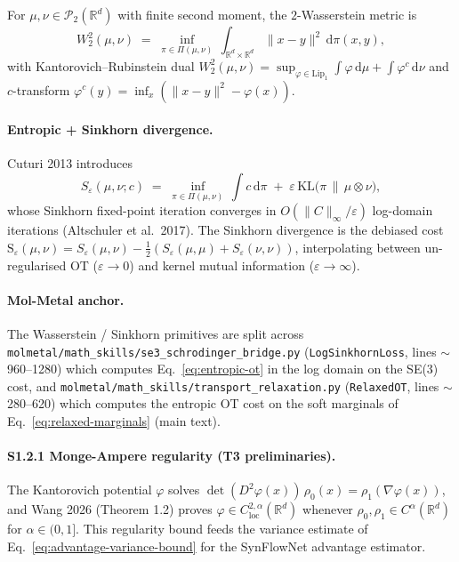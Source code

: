 For $\mu, \nu \in \mathcal{P}_{2}(\mathbb{R}^{d})$ with finite
second moment, the $2$-Wasserstein metric is
\begin{equation}
  \label{eq:w2-def}
  W_{2}^{2}(\mu, \nu) \;=\; \inf_{\pi \in \Pi(\mu, \nu)} \,
        \int_{\mathbb{R}^{d} \times \mathbb{R}^{d}} \| x - y \|^{2} \,
        \mathrm{d}\pi(x, y),
\end{equation}
with Kantorovich--Rubinstein dual
$W_{2}^{2}(\mu, \nu) = \sup_{\varphi \in \mathrm{Lip}_{1}}
\int \varphi \,\mathrm{d}\mu + \int \varphi^{c} \,\mathrm{d}\nu$
and $c$-transform
$\varphi^{c}(y) = \inf_{x} (\|x - y\|^{2} - \varphi(x))$.

\paragraph{Entropic + Sinkhorn divergence.}
Cuturi 2013 \cite{cuturi2013sinkhorn} introduces
\begin{equation}
  \label{eq:entropic-ot}
  S_{\varepsilon}(\mu, \nu; c) \;=\; \inf_{\pi \in \Pi(\mu, \nu)} \,
        \int c \,\mathrm{d}\pi \;+\; \varepsilon \,
        \mathrm{KL}\!\bigl(\pi \,\|\, \mu \otimes \nu \bigr),
\end{equation}
whose Sinkhorn fixed-point iteration converges in $O(\|C\|_{\infty}
/ \varepsilon)$ log-domain iterations (Altschuler et al.\ 2017).
The Sinkhorn divergence is the debiased cost
$\mathrm{S}_{\varepsilon}(\mu, \nu) = S_{\varepsilon}(\mu, \nu) -
\tfrac{1}{2}( S_{\varepsilon}(\mu, \mu) + S_{\varepsilon}(\nu,
\nu) )$, interpolating between un-regularised OT ($\varepsilon \to
0$) and kernel mutual information ($\varepsilon \to \infty$).

\paragraph{Mol-Metal anchor.}
The Wasserstein / Sinkhorn primitives are split across
\texttt{molmetal/math\_skills/se3\_schrodinger\_bridge.py}
(\texttt{LogSinkhornLoss}, lines $\sim$960--1280) which computes
Eq.~\eqref{eq:entropic-ot} in the log domain on the SE(3) cost,
and \texttt{molmetal/math\_skills/transport\_relaxation.py}
(\texttt{RelaxedOT}, lines $\sim$280--620) which computes the
entropic OT cost on the soft marginals of
Eq.~\eqref{eq:relaxed-marginals} (main text).

\paragraph{S1.2.1 Monge-Ampere regularity (T3 preliminaries).}
The Kantorovich potential $\varphi$ solves
$\det(D^{2} \varphi(x))\, \rho_{0}(x) = \rho_{1}(\nabla
\varphi(x))$, and Wang 2026 \cite{wang2026ma_regularity} (Theorem
1.2) proves $\varphi \in C^{2,\alpha}_{\mathrm{loc}}(\mathbb{R}^{d})$
whenever $\rho_{0}, \rho_{1} \in C^{\alpha}(\mathbb{R}^{d})$ for
$\alpha \in (0, 1]$.  This regularity bound feeds the variance
estimate of Eq.~\eqref{eq:advantage-variance-bound} for the
SynFlowNet advantage estimator.

